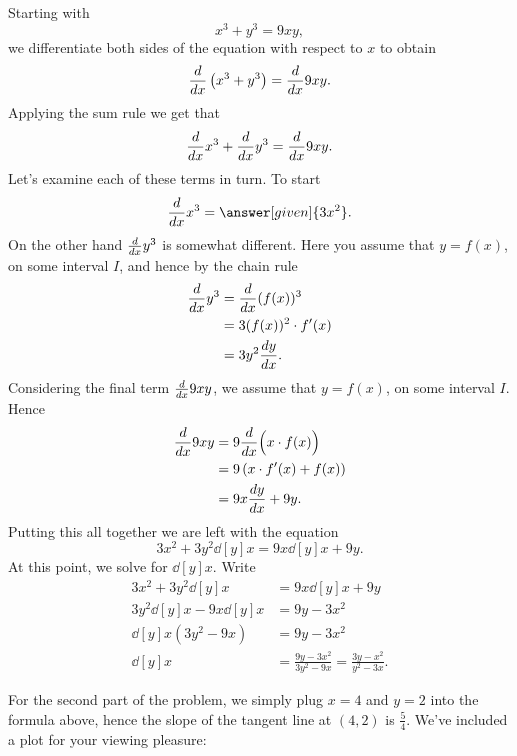 \documentclass{ximera}
\begin{document}
\begin{example}
\begin{explanation}
Starting with 
\[
x^3+y^3 = 9xy,
\]
we differentiate both sides of the
equation with respect to $x$ to obtain
\[
\ddx \left(x^3+y^3\right) = \ddx 9xy.
\]
Applying the sum rule we get that
\[
\ddx x^3+\ddx y^3 = \ddx 9xy.
\]
Let's examine each of these terms in turn. To start
\[
\ddx x^3 = \answer[given]{3x^2}.
\]
On the other hand $\ddx y^3$ is somewhat different. Here you assume that $y = f(x)$, on some interval $I$, and hence by the chain rule
\begin{align*}
\ddx y^3 &= \ddx (f(x))^3 \\ 
&= 3(f(x))^2 \cdot f'(x) \\
&= 3y^2\dd[y]{x}.
\end{align*}
Considering the final term $\ddx 9xy$, we assume that $y=f(x)$, on some interval $I$. Hence 
\begin{align*}
\ddx 9xy &= 9\ddx \Bigl(x\cdot f(x)\Bigr) \\
&= 9 \left(x\cdot f'(x) + f(x)\right)\\
&= 9x \dd[y]{x} + 9y.
\end{align*}
Putting this all together we are left with the equation
\[
3x^2 + 3y^2\dd[y]{x} =9x \dd[y]{x} + 9y.
\]
At this point, we solve for $\dd[y]{x}$. Write
\begin{align*}
3x^2 + 3y^2\dd[y]{x} &= 9x \dd[y]{x} + 9y\\
3y^2\dd[y]{x} -  9x \dd[y]{x} &= 9y - 3x^2\\
\dd[y]{x}\left(3y^2-9x\right)&= 9y - 3x^2\\
\dd[y]{x} &=\frac{9y - 3x^2}{3y^2-9x} = \frac{3y - x^2}{y^2-3x}.
\end{align*}

For the second part of the problem, we simply plug $x=4$ and $y=2$
into the formula above, hence the slope of the tangent line at $(4,2)$
is $\frac{5}{4}$. We've included a plot for your viewing pleasure:
\begin{image}
\end{image}
\end{explanation}
\end{example}
\end{document}
